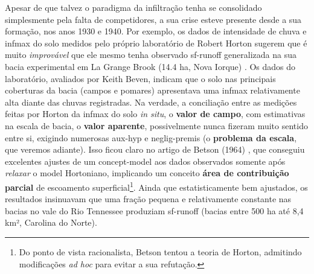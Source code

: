 \documentclass[./main.tex]{subfiles}
\begin{document}
\par Apesar de que talvez o \gls{paradigma} da infiltração tenha se consolidado simplesmente pela falta de competidores, a sua crise esteve presente desde a sua formação, nos anos 1930 e 1940. Por exemplo, os dados de intensidade de chuva e \gls{infmax} do solo medidos pelo próprio laboratório de Robert Horton sugerem que é muito \textit{improvável} que ele mesmo tenha observado \gls{sf-runoff} generalizada na sua bacia experimental em La Grange Brook (14.4 ha, Nova Iorque) \cite{Beven2004c}. Os dados do laboratório, avaliados por Keith Beven, indicam que o solo nas principais coberturas da bacia (campos e pomares) apresentava uma \gls{infmax} relativamente alta diante das chuvas registradas. Na verdade, a conciliação entre as medições feitas por Horton da \gls{infmax} do solo \textit{in situ}, o \textbf{valor de campo}, com estimativas na escala de bacia, o \textbf{valor aparente}, possivelmente nunca fizeram muito sentido entre si, exigindo numerosas \gls{aux-hyp} e \gls{neglig-premis} (o \textbf{problema da escala}, que veremos adiante). Isso ficou claro no artigo de Betson (1964) \cite{Betson1964}, que conseguiu excelentes ajustes de um \gls{concept-model} aos dados observados somente após \textit{relaxar} o \gls{model} Hortoniano, implicando um conceito \textbf{área de contribuição parcial} de escoamento superficial\footnote{Do ponto de vista racionalista, Betson tentou  a \gls{teoria} de Horton, admitindo modificações \textit{ad hoc} para evitar a sua refutação.}. Ainda que estatisticamente bem ajustados, os resultados insinuavam que uma fração pequena e relativamente constante nas bacias no vale do Rio Tennessee produziam \gls{sf-runoff} (bacias entre 500 ha até 8,4 km², Carolina do Norte).
\end{document}
